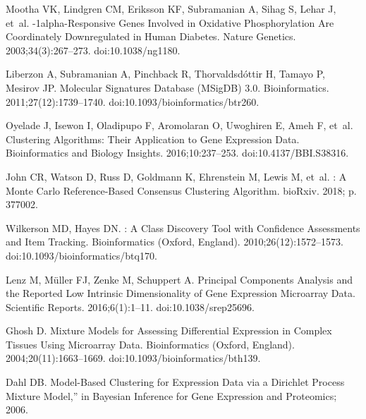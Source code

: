 \documentclass[10pt,letterpaper]{article}
\begin{document}
\begin{thebibliography}{10}
	Mootha VK, Lindgren CM, Eriksson KF, Subramanian A, Sihag S, Lehar J, et~al.
	-1alpha-Responsive Genes Involved in Oxidative Phosphorylation
	Are Coordinately Downregulated in Human Diabetes.
	\newblock Nature Genetics. 2003;34(3):267--273.
	\newblock doi:{10.1038/ng1180}.
	
	Liberzon A, Subramanian A, Pinchback R, Thorvaldsd{\'o}ttir H, Tamayo P,
	Mesirov JP.
	\newblock Molecular Signatures Database ({{MSigDB}}) 3.0.
	\newblock Bioinformatics. 2011;27(12):1739--1740.
	\newblock doi:{10.1093/bioinformatics/btr260}.
	
	Oyelade J, Isewon I, Oladipupo F, Aromolaran O, Uwoghiren E, Ameh F, et~al.
	\newblock Clustering {{Algorithms}}: {{Their Application}} to {{Gene Expression
			Data}}.
	\newblock Bioinformatics and Biology Insights. 2016;10:237--253.
	\newblock doi:{10.4137/BBI.S38316}.
	
	John CR, Watson D, Russ D, Goldmann K, Ehrenstein M, Lewis M, et~al.
	: {{A Monte Carlo}} Reference-Based Consensus Clustering
	Algorithm.
	\newblock bioRxiv. 2018; p. 377002.
	
	Wilkerson MD, Hayes DN.
	: A Class Discovery Tool with Confidence
	Assessments and Item Tracking.
	\newblock Bioinformatics (Oxford, England). 2010;26(12):1572--1573.
	\newblock doi:{10.1093/bioinformatics/btq170}.
	
	Lenz M, M{\"u}ller FJ, Zenke M, Schuppert A.
	\newblock Principal Components Analysis and the Reported Low Intrinsic
	Dimensionality of Gene Expression Microarray Data.
	\newblock Scientific Reports. 2016;6(1):1--11.
	\newblock doi:{10.1038/srep25696}.
	
	Ghosh D.
	\newblock Mixture Models for Assessing Differential Expression in Complex
	Tissues Using Microarray Data.
	\newblock Bioinformatics (Oxford, England). 2004;20(11):1663--1669.
	\newblock doi:{10.1093/bioinformatics/bth139}.
	
	Dahl DB.
	\newblock Model-Based Clustering for Expression Data via a {{Dirichlet}}
	Process Mixture Model,'' in {{Bayesian Inference}} for {{Gene Expression}}
	and {{Proteomics}}; 2006.
	

\end{thebibliography}
\end{document}
